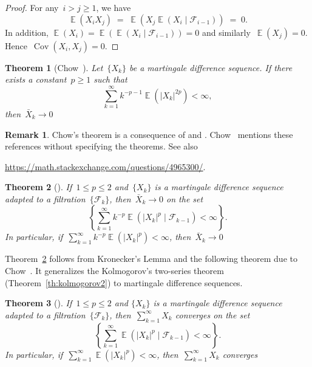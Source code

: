 \documentclass[12pt,a4paper]{article}  %
\newcounter{cite}
\newtheorem{theorem}{Theorem}[section]
\theoremstyle{definition}
\newtheorem{remark}{Remark}[section]
\numberwithin{equation}{section}
\newcommand{\FF}{\mathcal{F}}
\newcommand{\as}{{\text{a.s.}}\xspace}
\DeclareMathOperator{\cov}{Cov}
\DeclareMathOperator{\expc}{\mathbb{E}}
\begin{document}
\begin{proof}
    For any~$i > j \ge 1$, we have
    \[
        \expc(X_iX_j) \;=\;  \expc(X_j\expc(X_i\mathrel{|}\FF_{i-1})) \;=\; 0.
    \]
    In addition, $\expc(X_i) = \expc(\expc(X_i\mathrel{|}\FF_{i-1})) = 0$ and
    similarly~$\expc(X_j) = 0$. Hence~$\cov(X_i, X_j) = 0$.
\end{proof}

\begin{theorem}[Chow~\cite{Chow_1967}]
    \label{th:sllnmd1}
    Let~$\{X_k\}$ be a martingale difference sequence. If there exists a constant~$p\ge 1$ such that
   \[
       \sum_{k=1}^\infty k^{-p-1} \expc(|X_k|^{2p}) < \infty,
   \]
   then~$\bar{X}_k \to 0$ \as
\end{theorem}

\begin{remark}
    \label{rem:chow}
    Chow's theorem is a consequence of \cite[Theorem~2]{Chow_1960} and
    \cite[Theorem~9]{Burkholder_1966}. Chow~\cite{Chow_1967} mentions these references without
    specifying the theorems. See also
    \begin{center}
    \url{https://math.stackexchange.com/questions/4965300/}.
    \end{center}
\end{remark}

\begin{theorem}[\mbox{\cite[Theorem~2.18]{Hall_Heyde_1980}}]
    \label{th:sllnmd2}
    If~$1\le p\le 2$ and~$\{X_k\}$ is a martingale difference sequence adapted to a filtration~$\{\FF_k\}$,
    then~$\bar{X}_k \to 0$ \as on the set
   \[
       \left\{ \sum_{k=1}^\infty k^{-p} \expc(|X_k|^p
       \mathrel{|} \FF_{k-1}) < \infty \right\}.
   \]
   In particular, if~$\sum_{k=1}^\infty k^{-p} \expc(|X_k|^p) < \infty$, then~$\bar{X}_k \to 0$ \as
\end{theorem}

Theorem~\ref{th:sllnmd2} follows from Kronecker's Lemma and the following theorem due to
Chow~\cite{Chow_1965}. It generalizes the Kolmogorov's two-series theorem
(Theorem~\ref{th:kolmogorov2}) to martingale difference sequences.

\begin{theorem}[\mbox{\cite[Corollary~5]{Chow_1965}}]
    \label{th:kolmogorov2c}
    If~$1\le p\le 2$ and $\{X_k\}$ is a martingale difference sequence adapted to a filtration~$\{\FF_k\}$,
    then~$\sum_{k=1}^\infty X_k$ converges \as on the set
    \[
    \left\{\sum_{k=1}^\infty \expc(|X_k|^p\mathrel{|}\FF_{k-1}) < \infty\right\}.
    \]
    In particular, if~$\sum_{k=1}^\infty \expc(|X_k|^p) < \infty$, then~$\sum_{k=1}^\infty X_k$
    converges \as
\end{theorem}
\end{document}
